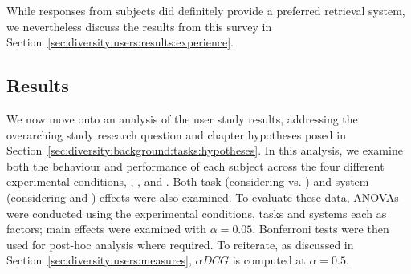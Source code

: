 While responses from subjects did definitely provide a preferred retrieval system, we nevertheless discuss the results from this survey in Section~\ref{sec:diversity:users:results:experience}.

\subsection{Results}
We now move onto an analysis of the user study results, addressing the overarching study research question and chapter hypotheses posed in Section~\ref{sec:diversity:background:tasks:hypotheses}. In this analysis, we examine both the behaviour and performance of each subject across the four different experimental conditions, , ,  and . Both task (considering  vs. ) and system (considering  and ) effects were also examined. To evaluate these data, ANOVAs were conducted using the experimental conditions, tasks and systems each as factors; main effects were examined with $\alpha=0.05$. Bonferroni tests were then used for post-hoc analysis where required. To reiterate, as discussed in Section~\ref{sec:diversity:users:measures}, $\alpha DCG$ is computed at $\alpha=0.5$.

